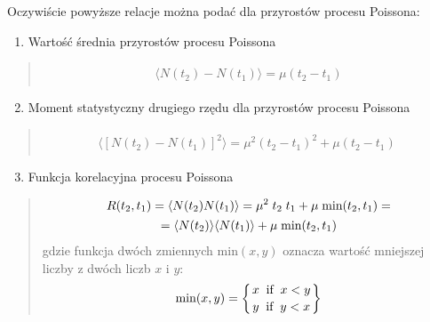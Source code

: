 \documentclass[a4paper,12pt,polish]{sphinxmanual}
\begin{document}
Oczywiście powyższe relacje można podać dla przyrostów procesu Poissona:
\begin{enumerate}
\item {} 
Wartość średnia przyrostów procesu Poissona

\end{enumerate}
\begin{quote}
\label{ch3/chIII021:equation-eqn31}\begin{gather}
\begin{split}\langle N(t_2) - N(t_1)\rangle = \mu (t_2-t_1)\end{split}\label{ch3/chIII021-eqn31}
\end{gather}\end{quote}
\begin{enumerate}
\setcounter{enumi}{1}
\item {} 
Moment statystyczny drugiego rzędu dla przyrostów procesu Poissona

\end{enumerate}
\begin{quote}
\label{ch3/chIII021:equation-eqn32}\begin{gather}
\begin{split}\langle [N(t_2) - N(t_1)]^2 \rangle = \mu^2 (t_2-t_1)^2 + \mu (t_2-t_1) \;\end{split}\label{ch3/chIII021-eqn32}
\end{gather}\end{quote}
\begin{enumerate}
\setcounter{enumi}{2}
\item {} 
Funkcja korelacyjna procesu Poissona

\end{enumerate}
\begin{quote}
\label{ch3/chIII021:equation-eqn33}\begin{gather}
\begin{split}R(t_2, t_1) = \langle N(t_2) N(t_1)\rangle = \mu^2 \;t_2 \;t_1 + \mu \; \mbox{min}(t_2, t_1) =\end{split}\label{ch3/chIII021-eqn33}\\\begin{split}= \langle N(t_2)\rangle\langle N(t_1)\rangle+ \mu \; \mbox{min}(t_2, t_1)\end{split}\notag
\end{gather}
gdzie funkcja dwóch zmiennych $\mbox{min}(x, y)$ oznacza wartość mniejszej liczby z dwóch liczb $x$ i $y$:
\label{ch3/chIII021:equation-eqn34}\begin{gather}
\begin{split}\mbox{min} (x, y) = \left\{ {{x \; \; \mbox{if}\; \; x < y} \atop {y \; \; \mbox{if} \; \; y<x}}\right\}\end{split}\label{ch3/chIII021-eqn34}
\end{gather}\end{quote}
\end{document}

